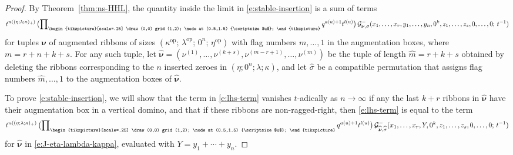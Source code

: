 \documentclass[12pt]{amsart}
\theoremstyle{definition}
\theoremstyle{remark}
\newcommand{\nubold}{{\boldsymbol \nu }}
\newcommand{\Gcal}{{\mathcal G}}
\newcommand{\mhat}{\widehat{m}}
\newcommand{\sigmahat}{\widehat{\sigma }}
\newcommand{\nuboldhat}{\widehat{\nubold }}
\newcommand{\domino}{\begin{tikzpicture}[scale=.25]
\draw (0,0) grid (1,2);
\node at (0.5,1.5) {\scriptsize $u$};
\end{tikzpicture}}
\DeclareMathOperator{\op}{op}
\begin{document}
\begin{proof}
By Theorem~\ref{thm:ns-HHL}, the quantity inside the limit in
\eqref{e:stable-insertion} is a sum of terms 
\begin{equation}\label{e:lhs-term}
t^{n((\eta ;\lambda ;\kappa )_{+})} \, \bigl(\prod \nolimits _{\domino
} q^{a(u)+1} t^{l(u)}\bigr) \, \Gcal ^{-}_{\nubold ,\sigma
}(x_{1},\ldots,x_{r}, y_{1},\ldots,y_{n}, 0^{k}, z_{1},\ldots,z_{s},
0,\ldots,0;\, t^{-1})
\end{equation}
for tuples $\nubold $ of augmented ribbons of sizes $(\kappa ^{\op
};\, \lambda ^{\op };\, 0^{n};\, \eta ^{\op })$ with flag numbers
$m,\ldots,1$ in the augmentation boxes, where $m=r+n+k+s$.  For any
such tuple, let $\nuboldhat = (\nu ^{(1)}, \ldots, \nu ^{(k+s)}, \nu
^{(m-r+1)}, \ldots, \nu ^{(m)})$ be the tuple of length $\mhat =r+k+s$
obtained by deleting the ribbons corresponding to the $n$ inserted
zeroes in $(\eta ;0^{n};\lambda ;\kappa )$, and let $\sigmahat $ be a
compatible permutation that assigns flag numbers $\mhat ,\ldots,1$ to
the augmentation boxes of $\nuboldhat $.

To prove \eqref{e:stable-insertion}, we will show that the term in
\eqref{e:lhs-term} vanishes $t$-adically as $n\rightarrow \infty $ if
any the last $k+r$ ribbons in $\nuboldhat $ have their augmentation
box in a vertical domino, and that if these ribbons are
non-ragged-right, then \eqref{e:lhs-term} is equal to the
term
\begin{equation}\label{e:rhs-term}
t^{n((\eta ;\lambda ;\kappa )_{+})} \, \bigl(\prod \nolimits _{\domino
} q^{a(u)+1} t^{l(u)}\bigr) \, \Gcal ^{-}_{\nuboldhat ,\sigmahat
}(x_{1},\ldots,x_{r}, Y, 0^{k}, z_{1},\ldots,z_{s}, 0,\ldots,0;\,
t^{-1})
\end{equation}
for $\nuboldhat $ in \eqref{e:J-eta-lambda-kappa}, evaluated with $Y =
y_{1}+\cdots +y_{n}$.


\end{proof}
\end{document}
